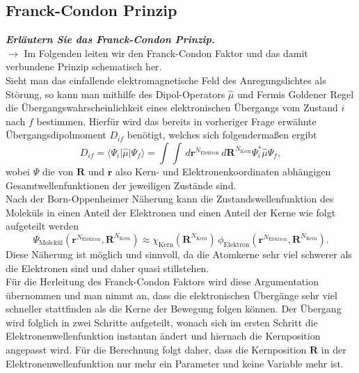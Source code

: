 \subsection{\label{subsec:FZV2}Franck-Condon Prinzip}
\textbf{\textit{Erläutern Sie das Franck-Condon Prinzip.}} \\
$\rightarrow$
Im Folgenden leiten wir den Franck-Condon Faktor und das damit verbundene Prinzip 
schematisch her. \\ 
Sieht man das einfallende elektromagnetische Feld des Anregungslichtes als 
Störung, so kann man mithilfe des Dipol-Operators $\hat{\mu}$ und 
Fermis Goldener Regel die Übergangswahrscheinlichkeit eines elektronischen 
Übergangs vom Zustand $i$ nach $f$ bestimmen. \newpage
Hierfür wird das bereits 
in vorheriger Frage erwähnte Übergangsdipolmoment $D_{if}$ benötigt, welches sich 
folgendermaßen ergibt 
\begin{equation}\label{eq:deflangle}
    D_{if} = \langle\Psi_{i}\vert \hat{\mu} \vert \Psi_{f}\rangle = \int\int\,d\mathbf{r}^{N_{\text{Elektron}}}\,d\mathbf{R}^{N_{\text{Kern}}} \Psi_{i}^{*}\hat{\mu}\Psi_{f},
\end{equation}
wobei $\Psi$ die von $\mathbf{R}$ und $\mathbf{r}$ also Kern- und Elektronenkoordinaten abhängigen Gesamtwellenfunktionen 
der jeweiligen Zustände sind. \\
Nach der Born-Oppenheimer Näherung kann die Zustandswellenfunktion des Moleküls in einen Anteil der 
Elektronen und einen Anteil der Kerne wie folgt aufgeteilt werden
\begin{equation}
    \Psi_{\text{Molekül}}(\mathbf{r}^{N_{\text{Elektron}}}, \mathbf{R}^{N_{\text{Kern}}}) \approx \chi_{\text{Kern}}(\mathbf{R}^{N_{\text{Kern}}})\,\phi_{\text{Elektron}}(\mathbf{r}^{N_{\text{Elektron}}}, \mathbf{R}^{N_{\text{Kern}}}).
\end{equation}
Diese Näherung ist möglich und sinnvoll, da die Atomkerne sehr viel schwerer als die Elektronen sind und daher quasi stillstehen. \\
Für die Herleitung des Franck-Condon Faktors wird diese Argumentation übernommen und man nimmt an, dass die elektronischen 
Übergänge sehr viel schneller stattfinden als die Kerne der Bewegung folgen können. Der Übergang wird folglich 
in zwei Schritte aufgeteilt, wonach sich im ersten Schritt die Elektronenwellenfunktion instantan ändert 
und hiernach die Kernposition angepasst wird. Für die Berechnung folgt daher, dass die Kernposition 
$\mathbf{R}$ in der Elektronenwellenfunktion nur mehr ein Parameter und keine Variable mehr ist. \\
